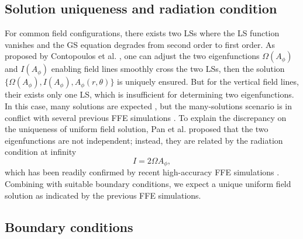 \documentclass[aps,prd,reprint,nofootinbib, superscriptaddress]{revtex4-1}
\def\Ap{A_\phi}
\def\be{\begin{equation}}
\def\ee{\end{equation}}
\begin{document}
\subsection{Solution uniqueness and radiation condition}
For common field configurations, there exists two LSs where
the LS function vanishes and the GS equation degrades from second order to first order. As proposed
by Contopoulos et al. \cite{Contopoulos2013}, one can adjust the two eigenfunctions $\Omega(\Ap)$
and $I(\Ap)$ enabling field lines smoothly cross the two LSs, then the solution
$\{\Omega(\Ap), I(\Ap), \Ap(r,\theta)\}$  is uniquely ensured. But for the vertical field lines, their
exists only one LS, which is insufficient for determining two eigenfunctions.
In this case, many solutions are expected \cite{Nathanail2014, Mahlmann2018}, but the many-solutions scenario is in
conflict with several previous FFE simulations \cite{Komissarov2004e, Komissarov2005,
Komissarov2007,Palenzuela2010,Paschalidis2013,Yang2015,Carrasco2017}.
To explain the discrepancy on the uniqueness of uniform field solution,
Pan et al. \cite{Pan2016a, Pan2017} proposed that the two eigenfunctions are not independent;
instead, they are related by the radiation condition at infinity
\be I = 2\Omega A_\phi, \label{eq:rad}\ee
which has been readily confirmed by recent high-accuracy FFE simulations \cite{East2018}.
Combining with suitable boundary conditions, we expect a unique uniform field solution as indicated
by the previous FFE simulations.

\subsection{Boundary conditions}
\end{document}
